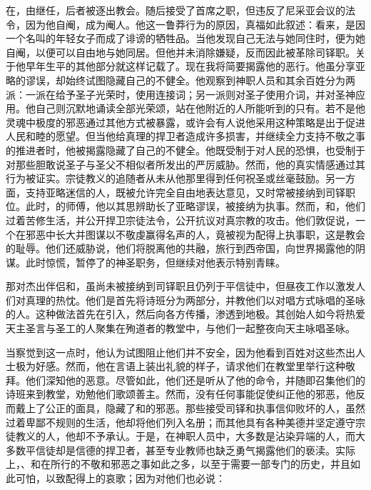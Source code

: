 在，由继任，后者被逐出教会。随后接受了首席之职，但违反了尼采亚会议的法令，因为他自阉，成为阉人。他这一鲁莽行为的原因，真福如此叙述：看来，是因一个名叫的年轻女子而成了诽谤的牺牲品。当他发现自己无法与她同住时，便为她自阉，以便可以自由地与她同居。但他并未消除嫌疑，反而因此被革除司铎职。关于他早年生平的其他部分就这样记载了。现在我将简要揭露他的恶行。他虽分享亚略的谬误，却始终试图隐藏自己的不健全。他观察到神职人员和其余百姓分为两派：一派在给予圣子光荣时，使用连接词；另一派则对圣子使用介词，并对圣神应用。他自己则沉默地诵读全部光荣颂，站在他附近的人所能听到的只有。若不是他灵魂中极度的邪恶通过其他方式被暴露，或许会有人说他采用这种策略是出于促进人民和睦的愿望。但当他给真理的捍卫者造成许多损害，并继续全力支持不敬之事的推进者时，他被揭露隐藏了自己的不健全。他既受制于对人民的恐惧，也受制于对那些胆敢说圣子与圣父不相似者所发出的严厉威胁。然而，他的真实情感通过其行为被证实。宗徒教义的追随者从未从他那里得到任何祝圣或丝毫鼓励。另一方面，支持亚略迷信的人，既被允许完全自由地表达意见，又时常被接纳到司铎职位。此时，的师傅，他以其思辨助长了亚略谬误，被接纳为执事。然而，和，他们过着苦修生活，并公开捍卫宗徒法令，公开抗议对真宗教的攻击。他们敦促说，一个在邪恶中长大并图谋以不敬虔赢得名声的人，竟被视为配得上执事职，这是教会的耻辱。他们还威胁说，他们将脱离他的共融，旅行到西帝国，向世界揭露他的阴谋。此时惊慌，暂停了的神圣职务，但继续对他表示特别青睐。\par

那对杰出伴侣和，虽尚未被接纳到司铎职且仍列于平信徒中，但昼夜工作以激发人们对真理的热忱。他们是首先将诗班分为两部分，并教他们以对唱方式咏唱的圣咏的人。这种做法首先在引入，然后向各方传播，渗透到地极。其创始人如今将热爱天主圣言与圣工的人聚集在殉道者的教堂中，与他们一起整夜向天主咏唱圣咏。\par

当察觉到这一点时，他认为试图阻止他们并不安全，因为他看到百姓对这些杰出人士极为好感。然而，他在言语上装出礼貌的样子，请求他们在教堂里举行这种敬拜。他们深知他的恶意。尽管如此，他们还是听从了他的命令，并随即召集他们的诗班来到教堂，劝勉他们歌颂善主。然而，没有任何事能促使纠正他的邪恶，他反而戴上了公正的面具，隐藏了和的邪恶。那些接受司铎和执事信仰败坏的人，虽然过着卑鄙不规则的生活，他却将他们列入名册；而其他具有各种美德并坚定遵守宗徒教义的人，他却不予承认。于是，在神职人员中，大多数是沾染异端的人，而大多数平信徒却是信德的捍卫者，甚至专业教师也缺乏勇气揭露他们的亵渎。实际上，、和在所行的不敬和邪恶之事如此之多，以至于需要一部专门的历史，并且如此可怕，以致配得上的哀歌；因为对他们也必说：\par

